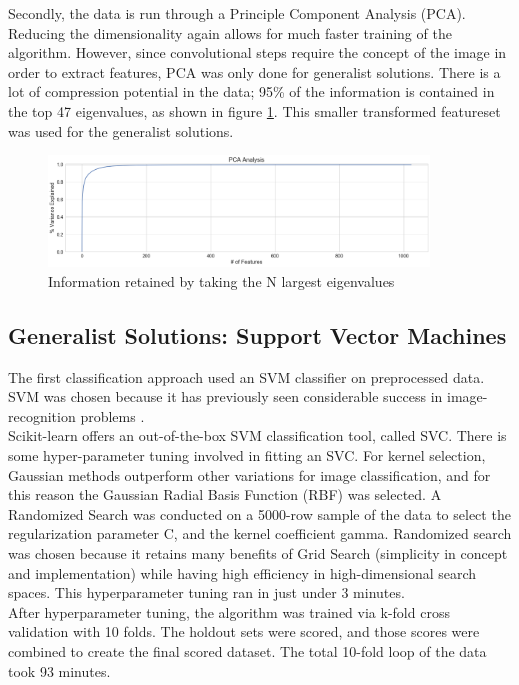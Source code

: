 \documentclass[12pt]{article}
\begin{document}
Secondly, the data is run through a Principle Component Analysis (PCA). Reducing the dimensionality again allows for much faster training of the algorithm. However, since convolutional steps require the concept of the image in order to extract features, PCA was only done for generalist solutions. There is a lot of compression potential in the data; 95\% of the information is contained in the top 47 eigenvalues, as shown in figure \ref{fig:pca}. This smaller transformed featureset was used for the generalist solutions.\\
\begin{figure}[h]
  \caption{Information retained by taking the N largest eigenvalues}
  \label{fig:pca}
\centering
\includegraphics[width=0.9\textwidth]{images/pca_information_retention.png}
\end{figure}

\subsection{Generalist Solutions: Support Vector Machines}
The first classification approach used an SVM classifier on preprocessed data. SVM was chosen because it has previously seen considerable success in image-recognition problems \citep{svmkernels}.\\

Scikit-learn offers an out-of-the-box SVM classification tool, called SVC. There is some hyper-parameter tuning involved in fitting an SVC. For kernel selection, Gaussian methods outperform other variations for image classification\citep{svmkernels}, and for this reason the Gaussian Radial Basis Function (RBF) was selected. A Randomized Search was conducted on a 5000-row sample of the data to select the regularization parameter C, and the kernel coefficient gamma. Randomized search was chosen because it retains many benefits of Grid Search (simplicity in concept and implementation) while having high efficiency in high-dimensional search spaces. This hyperparameter tuning ran in just under 3 minutes.\\

After hyperparameter tuning, the algorithm was trained via k-fold cross validation with 10 folds. The holdout sets were scored, and those scores were combined to create the final scored dataset. The total 10-fold loop of the data took 93 minutes.\\
\end{document}
